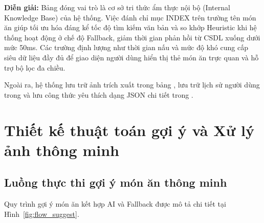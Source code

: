 \noindent\textbf{Diễn giải:} Bảng  đóng vai trò là cơ sở tri thức ẩm thực nội bộ (Internal Knowledge Base) của hệ thống. Việc đánh chỉ mục INDEX trên trường tên món ăn  giúp tối ưu hóa đáng kể tốc độ tìm kiếm văn bản và so khớp Heuristic khi hệ thống hoạt động ở chế độ Fallback, giảm thời gian phản hồi từ CSDL xuống dưới mức 50ms. Các trường định lượng như thời gian nấu và mức độ khó cung cấp siêu dữ liệu đầy đủ để giao diện người dùng hiển thị thẻ món ăn trực quan và hỗ trợ bộ lọc đa chiều.

Ngoài ra, hệ thống lưu trữ ảnh trích xuất trong bảng , lưu trữ lịch sử người dùng trong  và lưu công thức yêu thích dạng JSON chi tiết trong .

\section{Thiết kế thuật toán gợi ý và Xử lý ảnh thông minh}

\subsection{Luồng thực thi gợi ý món ăn thông minh}

Quy trình gợi ý món ăn kết hợp AI và Fallback được mô tả chi tiết tại Hình~\ref{fig:flow_suggest}.

